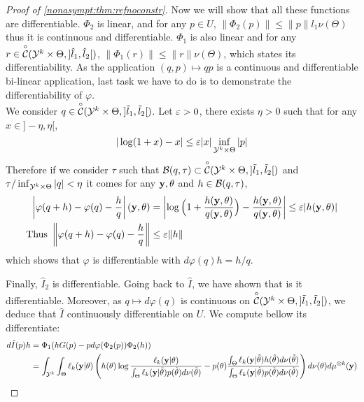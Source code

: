\begin{proof}[Proof of \cref{nonasympt:thm:refnoconstr}]
    Now we will show that all these functions are differentiable. $\Phi_2$ is linear, and for any $p\in U$,
        $\|\Phi_2(p)\| \leq\|p\| l_1\nu(\Theta)$
    thus it is continuous and differentiable. $\Phi_1$ is also linear and for any $r\in\overset{\circ}{\mathcal{C}}({\mathcal{Y}^k}\times\Theta,]\hat l_1,\hat l_2[)$, $\|\Phi_1(r)\|\leq \|r\|\nu(\Theta)$, which states its differentiability. As   the application $(q,p)\mapsto qp$ is a continuous and differentiable bi-linear application, last task we have to do is to demonstrate the differentiability of $\varphi$.\\
    We consider $q\in\overset{\circ}{\mathcal{C}}({\mathcal{Y}^k}\times\Theta,]\tilde l_1,\tilde l_2[)$. Let $\varepsilon>0$, there exists $\eta>0$ such that for any $x\in]-\eta,\eta[$, 
        $$|\log(1+x)-x| \leq \varepsilon|x|\inf_{{\mathcal{Y}^k}\times\Theta}|p|$$
    Therefore if we consider $\tau$ such that $\mathcal{B}(q,\tau)\subset\overset{\circ}{\mathcal{C}}({\mathcal{Y}^k}\times\Theta,]\tilde l_1,\tilde l_2[)$ and $\tau/\inf_{{\mathcal{Y}^k}\times\Theta}|q|<\eta$ it comes for any $\mathbf{y},\theta$ and $h\in\mathcal{B}(q,\tau)$,
        \begin{align*}
            \left|\varphi(q+h)-\varphi(q)-\frac{h}{q}\right|(\mathbf{y},\theta) &= \left|\log\Big(1+\frac{h(\mathbf{y},\theta)}{q(\mathbf{y},\theta)}\Big)-\frac{h(\mathbf{y},\theta)}{q(\mathbf{y},\theta)}\right|\leq \varepsilon |h(\mathbf{y},\theta)|\\
            \mbox{Thus }\left\|\varphi(q+h)-\varphi(q)-\frac{h}{q}\right\| &\leq\varepsilon\|h\|
        \end{align*}
    which shows that $\varphi$ is differentiable with $d\varphi(q)h=h/q$.
    
    Finally, $\hat I_2$ is differentiable.
    Going back to $\hat I$, we have shown that is it differentiable.
    Moreover, as $q\mapsto d\varphi(q)$ is continuous on $\overset{\circ}{\mathcal{C}}({\mathcal{Y}^k}\times\Theta,]\tilde l_1,\tilde l_2[)$, we deduce that $\hat I$ continuously differentiable on $U$. 
    We compute bellow its differentiate:
    \begin{align}\label{eq:differI}
        d\hat I(p)h &= \Phi_1(hG(p)-pd\varphi(\Phi_2 (p))\Phi_2(h))\\
                &= \int_{\mathcal{Y}^k}\int_\Theta  \ell_k(\mathbf{y}|\theta)\left( h(\theta) \log\frac{\ell_k(\mathbf{y}|\theta)}{\int_\Theta \ell_k(\mathbf{y}|\tilde\theta)p(\tilde\theta)d\nu(\tilde\theta)} - p(\theta)\frac{\int_\Theta \ell_k(\mathbf{y}|\tilde\theta)h(\tilde\theta)d\nu(\tilde\theta)}{\int_\Theta \ell_k(\mathbf{y}|\tilde\theta)p(\tilde\theta)d\nu(\tilde\theta)} \right)d\nu(\theta)d\mu^{\otimes k}(\mathbf{y}) \nonumber
    \end{align}
    

\end{proof}
